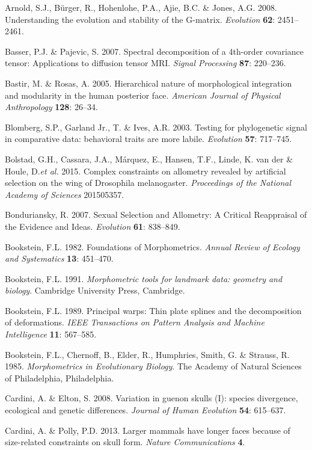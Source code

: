 \documentclass[12pt,twoside]{report}
\begin{document}
Arnold, S.J., Bürger, R., Hohenlohe, P.A., Ajie, B.C. \& Jones, A.G.
2008. Understanding the evolution and stability of the G-matrix.
\emph{Evolution} \textbf{62}: 2451--2461.

Basser, P.J. \& Pajevic, S. 2007. Spectral decomposition of a 4th-order
covariance tensor: Applications to diffusion tensor MRI. \emph{Signal
Processing} \textbf{87}: 220--236.

Bastir, M. \& Rosas, A. 2005. Hierarchical nature of morphological
integration and modularity in the human posterior face. \emph{American
Journal of Physical Anthropology} \textbf{128}: 26--34.

Blomberg, S.P., Garland Jr., T. \& Ives, A.R. 2003. Testing for
phylogenetic signal in comparative data: behavioral traits are more
labile. \emph{Evolution} \textbf{57}: 717--745.

Bolstad, G.H., Cassara, J.A., Márquez, E., Hansen, T.F., Linde, K. van
der \& Houle, D.\emph{et al.} 2015. Complex constraints on allometry
revealed by artificial selection on the wing of Drosophila melanogaster.
\emph{Proceedings of the National Academy of Sciences} 201505357.

Bonduriansky, R. 2007. Sexual Selection and Allometry: A Critical
Reappraisal of the Evidence and Ideas. \emph{Evolution} \textbf{61}:
838--849.

Bookstein, F.L. 1982. Foundations of Morphometrics. \emph{Annual Review
of Ecology and Systematics} \textbf{13}: 451--470.

Bookstein, F.L. 1991. \emph{Morphometric tools for landmark data:
geometry and biology}. Cambridge University Press, Cambridge.

Bookstein, F.L. 1989. Principal warps: Thin plate splines and the
decomposition of deformations. \emph{IEEE Transactions on Pattern
Analysis and Machine Intelligence} \textbf{11}: 567--585.

Bookstein, F.L., Chernoff, B., Elder, R., Humphries, Smith, G. \&
Strauss, R. 1985. \emph{Morphometrics in Evolutionary Biology}. The
Academy of Natural Sciences of Philadelphia, Philadelphia.

Cardini, A. \& Elton, S. 2008. Variation in guenon skulls (I): species
divergence, ecological and genetic differences. \emph{Journal of Human
Evolution} \textbf{54}: 615--637.

Cardini, A. \& Polly, P.D. 2013. Larger mammals have longer faces
because of size-related constraints on skull form. \emph{Nature
Communications} \textbf{4}.
\end{document}
